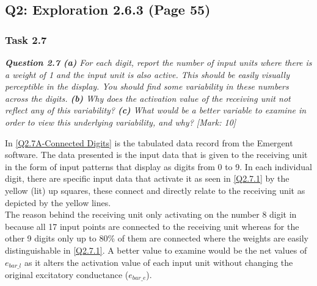 \subsection{Q2: Exploration 2.6.3 (Page 55)}
\label{Q2:Expl 2.6.3 SubSection}

\subsubsection{Task 2.7}
\label{Q1:Expl 2.6.3(2.7) SubSubSection}

\begin{tcolorbox}[colback=gray!20!white,colframe=gray!20!white]
  \emph{\textbf{Question 2.7 (a)} For each digit, report the number of input units where there is a weight of 1 and the input unit is also active. This should be easily visually perceptible in the display. You should find some variability in these numbers across the digits. \textbf{(b)} Why does the activation value of the receiving unit not reflect any of this variability? \textbf{(c)} What would be a better variable to examine in order to view this underlying variability, and why? [Mark: 10]}
\end{tcolorbox} 
\vspace{0.5cm}

In \cref{Q2.7A-Connected Digits} is the tabulated data record from the Emergent software. The data presented is the input data that is given to the receiving unit in the form of input patterns that display as digits from 0 to 9. In each individual digit, there are specific input data that activate it as seen in \cref{Q2.7.1} by the yellow (lit) up squares, these connect and directly relate to the receiving unit as depicted by the yellow lines. \\

The reason behind the receiving unit only activating on the number 8 digit in because all 17 input points are connected to the receiving unit whereas for the other 9 digits only up to 80\% of them are connected where the weights are easily distinguishable in \cref{Q2.7.1}. A better value to examine would be the net values of $e_{bar\_l}$ as it alters the activation value of each input unit without changing the original excitatory conductance ($e_{bar\_e}$).

